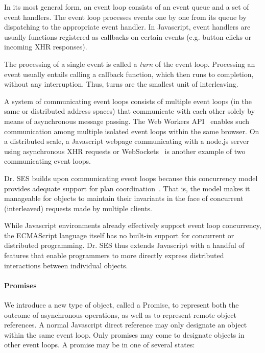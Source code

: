 \documentclass{llncs}
\begin{document}
In its most general form, an event loop consists of an event queue and a set of event handlers. The event loop processes events one by one from its queue by dispatching to the appropriate event handler. In Javascript, event handlers are usually functions registered as callbacks on certain events (e.g. button clicks or incoming XHR responses).

The processing of a single event is called a \emph{turn} of the event loop. Processing an event usually entails calling a callback function, which then runs to completion, without any interruption. Thus, turns are the smallest unit of interleaving.

A system of communicating event loops consists of multiple event loops (in the same or distributed address spaces) that communicate with each other solely by means of asynchronous message passing. The Web Workers API~\cite{webworkerspec} enables such communication among multiple isolated event loops within the same browser. On a distributed scale, a Javascript webpage communicating with a node.js server using asynchronous XHR requests or WebSockets~\cite{websocketsspec} is another example of two communicating event loops.

Dr. SES builds upon communicating event loops because this concurrency model provides adequate support for plan coordination~\cite{miller:strangers}. That is, the model makes it manageable for objects to maintain their invariants in the face of concurrent (interleaved) requests made by multiple clients.

While Javascript environments already effectively support event loop concurrency, the ECMAScript language itself has no built-in support for concurrent or distributed programming. Dr. SES thus extends Javascript with a handful of features that enable programmers to more directly express distributed interactions between individual objects.

\paragraph{Promises}

We introduce a new type of object, called a Promise, to represent both the outcome of asynchronous operations, as well as to represent remote object references. A normal Javascript direct reference may only designate an object within the same event loop. Only promises may come to designate objects in other event loops. A promise may be in one of several states:
\end{document}
